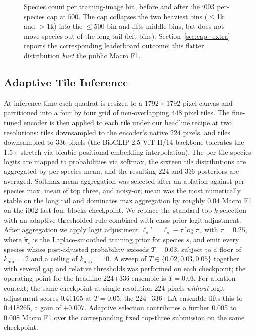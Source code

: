 \documentclass[sigconf]{ceurart}
\begin{document}
\begin{figure}[!htbp]
  \centering
  
  \caption{Species count per training-image bin, before and after the i003 per-species cap at $500$. The cap collapses the two heaviest bins ($\le$1k and $>$1k) into the $\le$500 bin and lifts middle bins, but does not move species out of the long tail (left bins). Section~\ref{sec:cap_extra} reports the corresponding leaderboard outcome: this flatter distribution \emph{hurt} the public Macro F1.}
  \label{fig:long_tail}
\end{figure}
\subsection{Adaptive Tile Inference}
\label{sec:adaptive_inference}
At inference time each quadrat is resized to a $1792 \times 1792$ pixel canvas and partitioned into a four by four grid of non-overlapping $448$ pixel tiles. The fine-tuned encoder is then applied to each tile under our headline recipe at two resolutions: tiles downsampled to the encoder's native $224$ pixels, and tiles downsampled to $336$ pixels (the BioCLIP 2.5 ViT-H/14 backbone tolerates the 1.5$\times$ stretch via bicubic positional-embedding interpolation). The per-tile species logits are mapped to probabilities via softmax, the sixteen tile distributions are aggregated by per-species mean, and the resulting 224 and 336 posteriors are averaged. Softmax-mean aggregation was selected after an ablation against per-species max, mean of top three, and noisy-or; mean was the most numerically stable on the long tail and dominates max aggregation by roughly 0.04 Macro F1 on the i002 last-four-blocks checkpoint.
We replace the standard top $k$ selection with an adaptive thresholded rule combined with class-prior logit adjustment. After aggregation we apply logit adjustment $\ell_s' = \ell_s - \tau \log \tilde{\pi}_s$ with $\tau{=}0.25$, where $\tilde{\pi}_s$ is the Laplace-smoothed training prior for species $s$, and emit every species whose post-adjusted probability exceeds $T{=}0.03$, subject to a floor of $k_{\min}{=}2$ and a ceiling of $k_{\max}{=}10$. A sweep of $T \in \{0.02, 0.03, 0.05\}$ together with several gap and relative thresholds was performed on each checkpoint; the operating point for the headline 224+336 ensemble is $T{=}0.03$. For ablation context, the same checkpoint at single-resolution 224 pixels \emph{without} logit adjustment scores 0.41165 at $T{=}0.05$; the 224+336+LA ensemble lifts this to 0.418265, a gain of $+0.007$. Adaptive selection contributes a further 0.005 to 0.008 Macro F1 over the corresponding fixed top-three submission on the same checkpoint.
\end{document}
